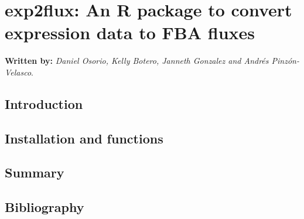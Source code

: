\chapter{exp2flux: An R package to convert expression data to FBA fluxes}
\textbf{Written by:} \textit{Daniel Osorio, Kelly Botero,  Janneth Gonzalez and Andrés Pinzón-Velasco}.\\
\section{Introduction}
\section{Installation and functions}
\section{Summary}
\section{Bibliography}